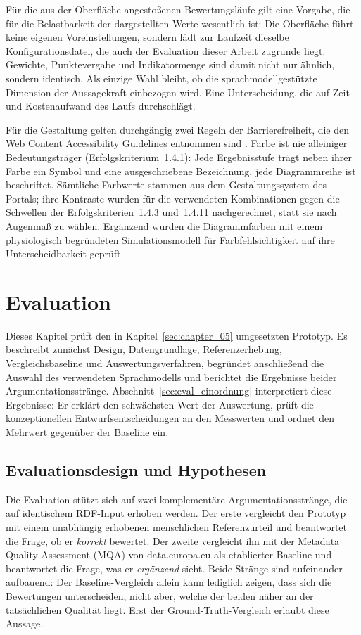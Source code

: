 Für die aus der Oberfläche angestoßenen Bewertungsläufe gilt eine Vorgabe, die für die Belastbarkeit der dargestellten Werte wesentlich ist: Die Oberfläche führt keine eigenen Voreinstellungen, sondern lädt zur Laufzeit dieselbe Konfigurationsdatei, die auch der Evaluation dieser Arbeit zugrunde liegt. Gewichte, Punktevergabe und Indikatormenge sind damit nicht nur ähnlich, sondern identisch. Als einzige Wahl bleibt, ob die sprachmodellgestützte Dimension der Aussagekraft einbezogen wird. Eine Unterscheidung, die auf Zeit- und Kostenaufwand des Laufs durchschlägt.

Für die Gestaltung gelten durchgängig zwei Regeln der Barrierefreiheit, die den Web Content Accessibility Guidelines entnommen sind \cite{w3c_wcag22}. Farbe ist nie alleiniger Bedeutungsträger (Erfolgskriterium~1.4.1): Jede Ergebnisstufe trägt neben ihrer Farbe ein Symbol und eine ausgeschriebene Bezeichnung, jede Diagrammreihe ist beschriftet. Sämtliche Farbwerte stammen aus dem Gestaltungssystem des Portals; ihre Kontraste wurden für die verwendeten Kombinationen gegen die Schwellen der Erfolgskriterien~1.4.3 und~1.4.11 nachgerechnet, statt sie nach Augenmaß zu wählen. Ergänzend wurden die Diagrammfarben mit einem physiologisch begründeten Simulationsmodell für Farbfehlsichtigkeit \cite{machado2009cvd} auf ihre Unterscheidbarkeit geprüft.

\chapter{Evaluation}
\label{sec:chapter_06}

Dieses Kapitel prüft den in Kapitel~\ref{sec:chapter_05} umgesetzten Prototyp. Es
beschreibt zunächst Design, Datengrundlage, Referenzerhebung, Vergleichsbaseline
und Auswertungsverfahren, begründet anschließend die Auswahl des verwendeten
Sprachmodells und berichtet die Ergebnisse beider Argumentationsstränge.
Abschnitt~\ref{sec:eval_einordnung} interpretiert diese Ergebnisse: Er erklärt den
schwächsten Wert der Auswertung, prüft die konzeptionellen
Entwurfsentscheidungen an den Messwerten und ordnet den Mehrwert gegenüber der
Baseline ein.

\section{Evaluationsdesign und Hypothesen}
\label{sec:eval_design}

Die Evaluation stützt sich auf zwei komplementäre Argumentationsstränge, die auf identischem
RDF-Input erhoben werden. Der erste vergleicht den Prototyp mit einem unabhängig
erhobenen menschlichen Referenzurteil und beantwortet die Frage, ob er \emph{korrekt} bewertet.
Der zweite vergleicht ihn mit der Metadata Quality Assessment (MQA) von data.europa.eu als
etablierter Baseline und beantwortet die Frage, was er \emph{ergänzend} sieht. Beide
Stränge sind aufeinander aufbauend: Der Baseline-Vergleich allein kann lediglich zeigen,
dass sich die Bewertungen unterscheiden, nicht aber, welche der beiden näher an der
tatsächlichen Qualität liegt. Erst der Ground-Truth-Vergleich erlaubt diese Aussage.

